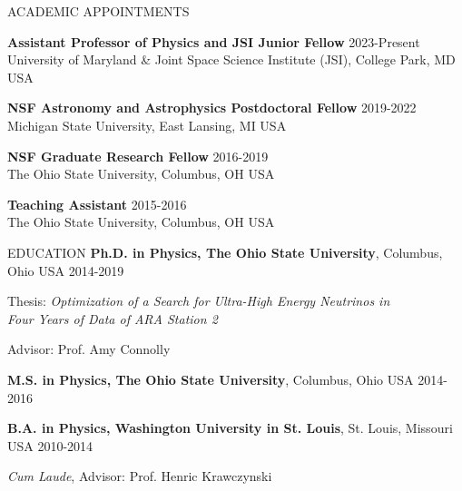 \documentclass{resume} %
\newenvironment{list1}{
  \begin{list}{\ding{113}}{%
      \setlength{\itemsep}{0in}
      \setlength{\parsep}{0in} \setlength{\parskip}{0in}
      \setlength{\topsep}{0in} \setlength{\partopsep}{0in} 
      \setlength{\leftmargin}{0.17in}}}{\end{list}}
\begin{document}
\begin{rSection}{ACADEMIC APPOINTMENTS}

\textbf{Assistant Professor of Physics and JSI Junior Fellow} \hfill 2023-Present \\ University of Maryland \& Joint Space Science Institute (JSI), College Park, MD USA 

\textbf{NSF Astronomy and Astrophysics Postdoctoral Fellow} \hfill 2019-2022 \\ Michigan State University, East Lansing, MI USA 

\textbf{NSF Graduate Research Fellow} \hfill 2016-2019 \\ The Ohio State University, Columbus, OH USA 

\textbf{Teaching Assistant} \hfill 2015-2016 \\ The Ohio State University, Columbus, OH USA 


\end{rSection}



\begin{rSection}{EDUCATION}
\textbf{Ph.D. in Physics, The Ohio State University}, Columbus, Ohio USA \hfill 2014-2019\\
\vspace*{-.15in}
\begin{list1}
\item[]Thesis: \textit{Optimization of a Search for Ultra-High Energy Neutrinos in \\ Four Years of Data of ARA Station 2} 
\item[]Advisor: Prof. Amy Connolly
\end{list1}

\textbf{M.S. in Physics, The Ohio State University}, Columbus, Ohio USA \hfill 2014-2016

\textbf{B.A. in Physics, Washington University in St. Louis}, St. Louis, Missouri USA \hfill 2010-2014\\
\vspace*{-.15in}
\begin{list1}
\item[] \textit{Cum Laude}, Advisor: Prof. Henric Krawczynski
\end{list1}
\end{rSection}


\end{document}
